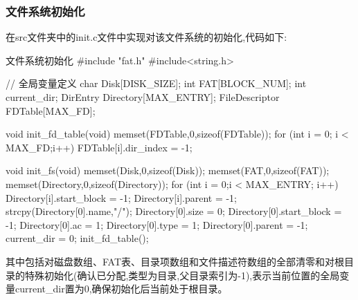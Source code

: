 \subsubsection{文件系统初始化}
在src文件夹中的init.c文件中实现对该文件系统的初始化,代码如下:
\begin{ccode}{文件系统初始化}
#include "fat.h"
#include<string.h>

// 全局变量定义
char Disk[DISK_SIZE];
int FAT[BLOCK_NUM];
int current_dir;
DirEntry Directory[MAX_ENTRY];
FileDescriptor FDTable[MAX_FD];

void init_fd_table(void){
    memset(FDTable,0,sizeof(FDTable));
    for (int i = 0; i < MAX_FD;i++){
        FDTable[i].dir_index = -1;
    }
}

void init_fs(void){
    memset(Disk,0,sizeof(Disk));
    memset(FAT,0,sizeof(FAT));
    memset(Directory,0,sizeof(Directory));
    for (int i = 0;i < MAX_ENTRY; i++){
        Directory[i].start_block = -1;
        Directory[i].parent = -1;
    }
    strcpy(Directory[0].name,"/");
    Directory[0].size = 0;
    Directory[0].start_block = -1;
    Directory[0].ac = 1;
    Directory[0].type = 1;
    Directory[0].parent = -1;
    current_dir = 0;
    init_fd_table();
}
\end{ccode}
其中包括对磁盘数组、FAT表、目录项数组和文件描述符数组的全部清零和对根目录的特殊初始化(确认已分配,类型为目录,父目录索引为-1),表示当前位置的全局变量current\_dir置为0,确保初始化后当前处于根目录。

